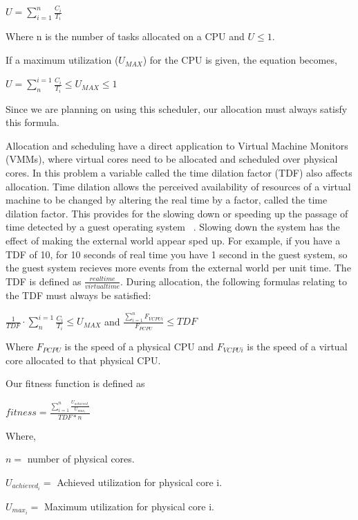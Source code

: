 \documentclass[11pt]{article}
\begin{document}
\begin{center}
$U = \sum_{i=1}^{n} \frac{C_{i}}{T_{i}}$ 
\end{center}

Where n is the number of tasks allocated on a CPU and $U \leq 1$. 

If a maximum utilization ($U_{MAX}$) for the CPU is given, the equation becomes,

\begin{center}
$U = \sum_{n}^{i=1} \frac{C_{i}}{T_{i}} \leq U_{MAX} \leq 1$ 
\end{center}

Since we are planning on using this scheduler, our allocation must always satisfy this formula.

Allocation and scheduling have a direct application to Virtual Machine Monitors (VMMs), where virtual cores need to be allocated and scheduled over physical cores. In this problem a variable called the time dilation factor (TDF) also affects allocation. Time dilation allows the perceived availability of resources of a virtual machine to be changed by altering the real time by a factor, called the time dilation factor. This provides for the slowing down or speeding up the passage of time detected by a guest operating system ~\cite{Gupta:06}. Slowing down the system has the effect of making the external world appear sped up. For example, if you have a TDF of 10, for 10 seconds of real time you have 1 second in the guest system, so the guest system recieves more events from the external world per unit time. The TDF is defined as $\frac{real time}{virtual time}$. During allocation, the following formulas relating to the TDF must always be satisfied:

\begin{center}
$ \frac{1}{TDF} \cdot \sum_{n}^{i=1} \frac{C_{i}}{T_{i}} \leq U_{MAX}$ and
$\frac{\sum_{i=1}^{n} F_{VCPUi} }{F_{PCPU}} \leq TDF$
\end{center}

Where $F_{PCPU}$ is the speed of a physical CPU and $F_{VCPUi}$ is the speed of a virtual core allocated to that physical CPU.

Our fitness function is defined as

\begin{center}

$fitness = \frac{\sum_{i=1}^{n} \frac{U_{achieved_i}}{U_{max_i}}}{TDF*n}$

\begin{flushleft}
Where,

$n =$ number of physical cores.

$U_{achieved_{i}} =$ Achieved utilization for physical core i.

$U_{max_{i}} =$ Maximum utilization for physical core i.
\end{flushleft}

\end{center}
\end{document}
